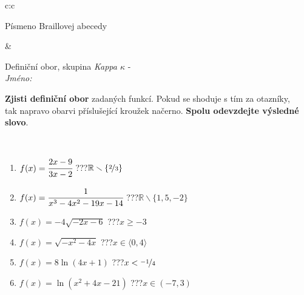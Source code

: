 \documentclass[10pt]{report}
\begin{document}
\begin{tabular}{c:c}
\begin{minipage}[c][104.5mm][t]{0.5\linewidth}
\begin{center}
\begin{minipage}{0.20\linewidth}
\begin{center}
{\small Písmeno Braillovej abecedy}
\end{center}
\end{minipage}
\end{center}
\end{minipage}
&
\begin{minipage}[c][104.5mm][t]{0.5\linewidth}
\begin{center}
\vspace{7mm}
{\huge Definiční obor, skupina \textit{Kappa $\kappa$} -}\\[5mm]
\textit{Jméno:}\phantom{xxxxxxxxxxxxxxxxxxxxxxxxxxxxxxxxxxxxxxxxxxxxxxxxxxxxxxxxxxxxxxxxx}\\[5mm]
\begin{minipage}{0.95\linewidth}
\begin{center}
\textbf{Zjisti definiční obor} zadaných funkcí. Pokud se shoduje s tím za otazníky,\\tak napravo obarvi příslušející kroužek načerno. \textbf{Spolu odevzdejte výsledné slovo}.
\end{center}
\end{minipage}
\\[1mm]
\begin{minipage}{0.79\linewidth}
\begin{center}
\begin{varwidth}{\linewidth}
\begin{enumerate}
\normalsizerrr
\item $f(x)=\cfrac{2x-9}{3x-2}$\quad \dotfill\; ???\;\dotfill \quad $\mathbb{R}\smallsetminus\{\nicefrac{2}{3}\}$
\item $f(x)=\cfrac{1}{x^3-4x^2-19x-14}$\quad \dotfill\; ???\;\dotfill \quad $\mathbb{R}\smallsetminus\{1,5,-2\}$
\item $f(x)=-4\sqrt{-2x-6}$\quad \dotfill\; ???\;\dotfill \quad $x\geq-3$
\item $f(x)=\sqrt{-x^2-4x}$\quad \dotfill\; ???\;\dotfill \quad $x\in\langle0 , 4\rangle$
\item $f(x)=8\ln{(4x+1)}$\quad \dotfill\; ???\;\dotfill \quad $x<\nicefrac{-1}{4}$
\item $f(x)=\ln{(x^2+4x-21)}$\quad \dotfill\; ???\;\dotfill \quad $x\in(-7 , 3)$
\end{enumerate}
\end{varwidth}
\end{center}
\end{minipage}
\begin{minipage}{0.20\linewidth}
\begin{center}

\end{center}
\end{minipage}
\end{center}
\end{minipage}
\end{tabular}
\end{document}
